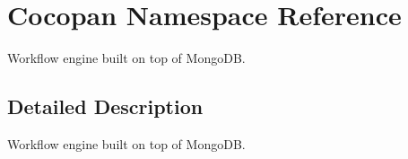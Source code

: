 \hypertarget{namespace_cocopan}{}\section{Cocopan Namespace Reference}
\label{namespace_cocopan}


Workflow engine built on top of Mongo\+DB.  




\subsection{Detailed Description}
Workflow engine built on top of Mongo\+DB. 


